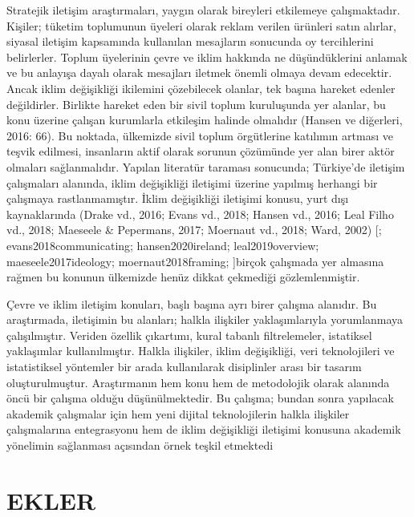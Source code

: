 \documentclass[
]{book}
\begin{document}
Stratejik iletişim araştırmaları, yaygın olarak bireyleri etkilemeye çalışmaktadır. Kişiler; tüketim toplumunun üyeleri olarak reklam verilen ürünleri satın alırlar, siyasal iletişim kapsamında kullanılan mesajların sonucunda oy tercihlerini belirlerler. Toplum üyelerinin çevre ve iklim hakkında ne düşündüklerini anlamak ve bu anlayışa dayalı olarak mesajları iletmek önemli olmaya devam edecektir. Ancak iklim değişikliği ikilemini çözebilecek olanlar, tek başına hareket edenler değildirler. Birlikte hareket eden bir sivil toplum kuruluşunda yer alanlar, bu konu üzerine çalışan kurumlarla etkileşim halinde olmalıdır (Hansen ve diğerleri, 2016: 66). Bu noktada, ülkemizde sivil toplum örgütlerine katılımın artması ve teşvik edilmesi, insanların aktif olarak sorunun çözümünde yer alan birer aktör olmaları sağlanmalıdır.
Yapılan literatür taraması sonucunda; Türkiye'de iletişim çalışmaları alanında, iklim değişikliği iletişimi üzerine yapılmış herhangi bir çalışmaya rastlanmamıştır. İklim değişikliği iletişimi konusu, yurt dışı kaynaklarında (Drake vd., 2016; Evans vd., 2018; Hansen vd., 2016; Leal Filho vd., 2018; Maeseele \& Pepermans, 2017; Moernaut vd., 2018; Ward, 2002) {[}\citet{drake2016communicating}; evans2018communicating; hansen2020ireland; leal2019overview; maeseele2017ideology; moernaut2018framing; \citet{crosling2002oral}{]}birçok çalışmada yer almasına rağmen bu konunun ülkemizde henüz dikkat çekmediği gözlemlenmiştir.

Çevre ve iklim iletişim konuları, başlı başına ayrı birer çalışma alanıdır. Bu araştırmada, iletişimin bu alanları; halkla ilişkiler yaklaşımlarıyla yorumlanmaya çalışılmıştır. Veriden özellik çıkartımı, kural tabanlı filtrelemeler, istatiksel yaklaşımlar kullanılmıştır. Halkla ilişkiler, iklim değişikliği, veri teknolojileri ve istatistiksel yöntemler bir arada kullanılarak disiplinler arası bir tasarım oluşturulmuştur. Araştırmanın hem konu hem de metodolojik olarak alanında öncü bir çalışma olduğu düşünülmektedir. Bu çalışma; bundan sonra yapılacak akademik çalışmalar için hem yeni dijital teknolojilerin halkla ilişkiler çalışmalarına entegrasyonu hem de iklim değişikliği iletişimi konusuna akademik yönelimin sağlanması açısından örnek teşkil etmektedi

\hypertarget{ekler}{%
\chapter*{EKLER}\label{ekler}}
\end{document}
